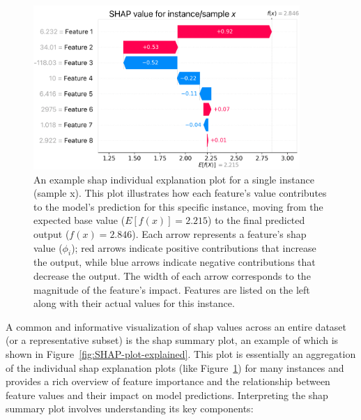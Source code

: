\documentclass[12pt,a4paper]{report}
\begin{document}
\begin{figure}[h!]
  \centering
  \includegraphics[width=0.9\textwidth]{images/SHAP-explained-individual.png}
  \caption[Example \gls{shap} Individual Explanation Plot]{An example \gls{shap} individual explanation plot for a single instance (sample x). This plot illustrates how each feature's value contributes to the model's prediction for this specific instance, moving from the expected base value ($E[f(x)] = 2.215$) to the final predicted output ($f(x) = 2.846$). Each arrow represents a feature's \gls{shap} value ($\phi_i$); red arrows indicate positive contributions that increase the output, while blue arrows indicate negative contributions that decrease the output. The width of each arrow corresponds to the magnitude of the feature's impact. Features are listed on the left along with their actual values for this instance.}
  \label{fig:SHAP-individual-explained} %
\end{figure}
\noindent A common and informative visualization of \gls{shap} values across an entire dataset (or a representative subset) is the \gls{shap} summary plot, an example of which is shown in Figure~\ref{fig:SHAP-plot-explained}. This  plot is essentially an aggregation of the individual \gls{shap} explanation plots (like Figure~\ref{fig:SHAP-individual-explained}) for many instances and provides a rich overview of feature importance and the relationship between feature values and their impact on model predictions. Interpreting the \gls{shap} summary plot involves understanding its key components:
\pagebreak
\end{document}
